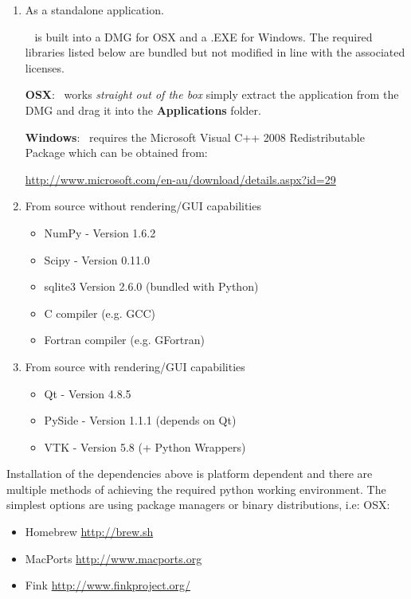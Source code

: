 \begin{enumerate}

\item As a standalone application.
 
\nanocap~ is built into a DMG for OSX and a .EXE for Windows. The required libraries listed below are bundled but not modified in line with the associated licenses. 

\textbf{OSX}:  \nanocap~works \textit{straight out of the box} simply extract the application from the DMG and drag it into the \textbf{Applications} folder.

\textbf{Windows}:  \nanocap~requires the Microsoft Visual C++ 2008 Redistributable Package which can be obtained from:

 \url{http://www.microsoft.com/en-au/download/details.aspx?id=29}


 \item From source without rendering/GUI capabilities

\begin{itemize}
 \item NumPy - Version 1.6.2
 \item Scipy - Version 0.11.0
 \item sqlite3 Version 2.6.0 (bundled with Python)
 \item C compiler (e.g. GCC)
 \item Fortran compiler (e.g. GFortran)
 \end{itemize}
 
 \item From source with rendering/GUI capabilities

\begin{itemize}
 \item Qt - Version 4.8.5 
 \item PySide - Version 1.1.1 (depends on Qt)
 \item VTK - Version 5.8 (+ Python Wrappers)
 \end{itemize}
 
 \end{enumerate}
Installation of the dependencies above is platform dependent and there are multiple methods of achieving the required python working environment. The simplest options are using package managers or binary distributions, i.e:
\newline\newline
OSX:
\begin{itemize}
 \item Homebrew \url{http://brew.sh}
 \item MacPorts \url{http://www.macports.org}
 \item Fink \url{http://www.finkproject.org/}
 \end{itemize}
